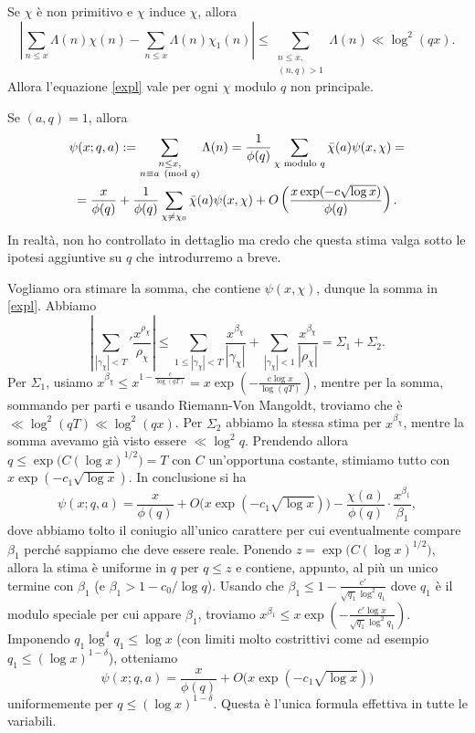 \begin{oss}
  Se $\chi$ è non primitivo e $\chi$ induce $\chi$, allora
  $$\left| \sum_{n \le x} \Lambda(n)\chi(n)-\sum_{n \le x}\Lambda(n)\chi_1(n)\right| \le \sum_{\substack{n \le x,\\ (n,q)>1}} \Lambda(n) \ll \log^2(qx).$$
  Allora l'equazione \eqref{expl} vale per ogni $\chi$ modulo $q$ non principale.
\end{oss}

\begin{cor}
  Se $(a,q)=1$, allora
  \begin{gather*}
    \psi(x;q,a):=\sum_{\substack{n \le x,\\ n \equiv a \pmod{q}}} \Lambda(n)=\frac{1}{\phi(q)} \sum_{\chi\textnormal{ modulo }q} \bar{\chi}(a)\psi(x,\chi)= \\
    =\frac{x}{\phi(q)}+\frac{1}{\phi(q)}\sum_{\chi\not=\chi_0} \bar{\chi}(a)\psi(x,\chi)+O\left(\frac{x\exp(-c\sqrt{\log x})}{\phi(q)}\right).
  \end{gather*}
  In realtà, non ho controllato in dettaglio ma credo che questa stima valga sotto le ipotesi aggiuntive su $q$ che introdurremo a breve.
\end{cor}

Vogliamo ora stimare la somma, che contiene $\psi(x,\chi)$, dunque la somma in \eqref{expl}. Abbiamo
$$\left|\sum_{|\gamma_\chi|<T}' \frac{x^{\rho_\chi}}{\rho_\chi}\right| \le \sum_{1 \le |\gamma_\chi|<T} \frac{x^{\beta_\chi}}{|\gamma_\chi|}+\sum_{|\gamma_\chi| < 1} \frac{x^{\beta_\chi}}{|\rho_\chi|}=\Sigma_1+\Sigma_2.$$
Per $\Sigma_1$, usiamo $x^{\beta_\chi} \le x^{1-\frac{c}{\log(qT)}}=x\exp\left(-\frac{c\log{x}}{\log(qT)}\right)$, mentre per la somma, sommando per parti e usando Riemann-Von Mangoldt, troviamo che è $\ll \log^2(qT) \ll \log^2(qx)$. Per $\Sigma_2$ abbiamo la stessa stima per $x^{\beta_\chi}$, mentre la somma avevamo già visto essere $\ll \log^2{q}$.
Prendendo allora $q \le \exp\big(C(\log{x})^{1/2}\big)=T$ con $C$ un'opportuna costante, stimiamo tutto con $x\exp(-c_1\sqrt{\log{x}})$. In conclusione si ha
$$\psi(x;q,a)=\frac{x}{\phi(q)}+O\big(x\exp(-c_1\sqrt{\log{x}})\big)-\frac{\chi(a)}{\phi(q)}\cdot\frac{x^{\beta_1}}{\beta_1},$$
dove abbiamo tolto il coniugio all'unico carattere per cui eventualmente compare $\beta_1$ perché sappiamo che deve essere reale. Ponendo $z=\exp\big(C(\log{x})^{1/2}\big)$, allora la stima è uniforme in $q$ per $q \le z$ e contiene, appunto, al più un unico termine con $\beta_1$ (e $\beta_1>1-c_0/\log{q}$).
Usando che $\beta_1 \le 1-\frac{c'}{\sqrt{q_1}\log^2{q_1}}$ dove $q_1$ è il modulo speciale per cui appare $\beta_1$, troviamo $x^{\beta_1} \le x\exp\left(-\frac{c'\log{x}}{\sqrt{q_1}\log^2{q_1}}\right)$.
Imponendo $q_1\log^4{q_1} \le \log{x}$ (con limiti molto costrittivi come ad esempio $q_1 \le (\log{x})^{1-\delta}$), otteniamo
$$\psi(x;q,a)=\frac{x}{\phi(q)}+O\big(x\exp(-c_1\sqrt{\log{x}})\big)$$
uniformemente per $q \le (\log{x})^{1-\delta}$. Questa è l'unica formula effettiva in tutte le variabili.

